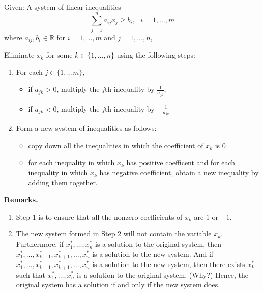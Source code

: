 Given: A system of linear inequalities
\[ \sum_{j=1}^n a_{ij} x_j \geq b_i,~~~i = 1,\ldots,m\] where
\(a_{ij}, b_i \in \mathbb{R}\) for \(i = 1,\ldots,m\) and
\(j = 1,\ldots,n\),

Eliminate \(x_k\) for some \(k \in \{1,\ldots,n\}\) using the following
steps:

\begin{enumerate}
\def\labelenumi{\arabic{enumi}.}
\item
  For each \(j \in \{1,\ldots m\}\),

  \begin{itemize}
  \tightlist
  \item
    if \(a_{jk} \gt 0\), multiply the \(j\)th inequality by
    \(\frac{1}{a_{jk}}\),
  \item
    if \(a_{jk} \lt 0\), multiply the \(j\)th inequality by
    \(-\frac{1}{a_{jk}}\)
  \end{itemize}
\item
  Form a new system of inequalities as follows:

  \begin{itemize}
  \tightlist
  \item
    copy down all the inequalities in which the coefficient of \(x_k\)
    is 0
  \item
    for each inequality in which \(x_k\) has positive coefficent and for
    each inequality in which \(x_k\) has negative coefficient, obtain a
    new inequality by adding them together.
  \end{itemize}
\end{enumerate}

\textbf{Remarks.}

\begin{enumerate}
\def\labelenumi{\arabic{enumi}.}
\item
  Step 1 is to ensure that all the nonzero coefficients of \(x_k\) are
  \(1\) or \(-1\).
\item
  The new system formed in Step 2 will not contain the variable \(x_k\).
  Furthermore, if \(x_1^*,\ldots, x_n^*\) is a solution to the original
  system, then \(x_1^*,\ldots,x_{k-1}^*, x_{k+1}^*,\ldots, x_n^*\) is a
  solution to the new system. And if
  \(x_1^*,\ldots,x_{k-1}^*, x_{k+1}^*,\ldots, x_n^*\) is a solution to
  the new system, then there exists \(x_k^*\) such that
  \(x_1^*,\ldots, x_n^*\) is a solution to the original system. (Why?)
  Hence, the original system has a solution if and only if the new
  system does.
\end{enumerate}

